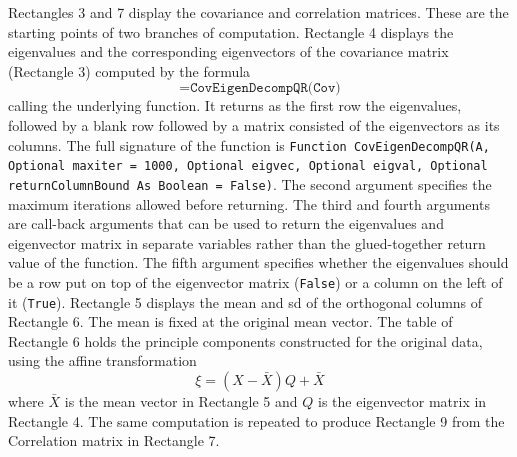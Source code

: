 \documentclass[article]{jss}
\numberwithin{equation}{subsection}
\begin{document}
        Rectangles 3 and 7 display the covariance and correlation matrices. These are the starting points of two branches of computation. 
        Rectangle 4 displays the eigenvalues and the corresponding eigenvectors of the covariance matrix (Rectangle 3) computed by the formula $$\texttt{=CovEigenDecompQR(Cov)}$$ calling the underlying  function. It returns as the first row the eigenvalues, followed by a blank row followed by a matrix consisted of the eigenvectors as its columns. The full signature of the function is \texttt{Function CovEigenDecompQR(A, Optional maxiter = 1000, Optional eigvec,  Optional eigval, Optional returnColumnBound As Boolean = False)}. The second argument specifies the maximum iterations allowed before returning. The third and fourth arguments are call-back arguments that can be used to return the eigenvalues and eigenvector matrix in separate variables rather than the glued-together return value of the function. The fifth argument specifies whether the eigenvalues should be a row put on top of the eigenvector matrix (\texttt{False}) or a column on the left of it (\texttt{True}).
        Rectangle 5 displays the mean and sd of the orthogonal columns of Rectangle 6. The mean is fixed at the original mean vector.
        The table of Rectangle 6 holds the principle components constructed for the original data, using the affine transformation $$\xi  = \left( {X - \bar X} \right)Q + \bar X$$ where $\bar X$ is the mean vector in Rectangle 5 and $Q$ is the eigenvector matrix in Rectangle 4. The same computation is repeated to produce Rectangle 9 from the Correlation matrix in Rectangle 7. 
        
\end{document}
